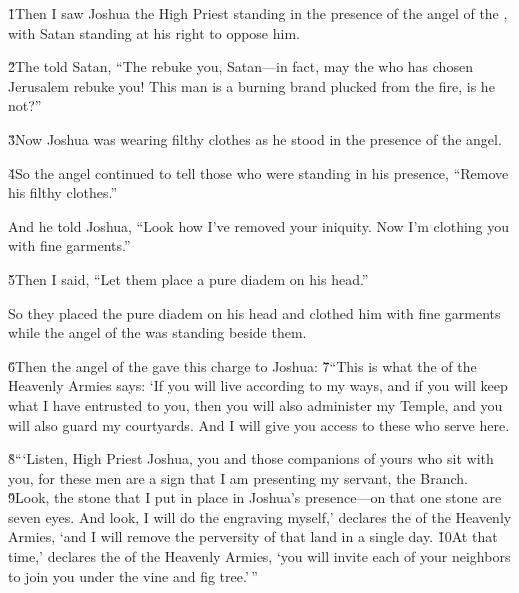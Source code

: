 \v{1}Then I saw Joshua the High Priest standing in the presence of the angel of the , with Satan standing at his right to oppose him.

\v{2}The  told Satan, ``The  rebuke you, Satan---in fact, may the  who has chosen Jerusalem rebuke you! This man is a burning brand plucked from the fire, is he not?''

\v{3}Now Joshua was wearing filthy clothes as he stood in the presence of the angel.

\v{4}So the angel continued to tell those who were standing in his presence, ``Remove his filthy clothes.''

And he told Joshua, ``Look how I've removed your iniquity. Now I'm clothing you with fine garments.''

\v{5}Then I said, ``Let them place a pure diadem on his head.''

So they placed the pure diadem on his head and clothed him with fine garments while the angel of the  was standing beside them.

\v{6}Then the angel of the  gave this charge to Joshua: \v{7}``This is what the  of the Heavenly Armies says: `If you will live according to my ways, and if you will keep what I have entrusted to you, then you will also administer my Temple, and you will also guard my courtyards. And I will give you access to these who serve here.

\v{8}```Listen, High Priest Joshua, you and those companions of yours who sit with you, for these men are a sign that I am presenting my servant, the Branch. \v{9}Look, the stone that I put in place in Joshua's presence---on that one stone are seven eyes. And look, I will do the engraving myself,' declares the  of the Heavenly Armies, `and I will remove the perversity of that land in a single day. \v{10}At that time,' declares the  of the Heavenly Armies, `you will invite each of your neighbors to join you under the vine and fig tree.'\,''

